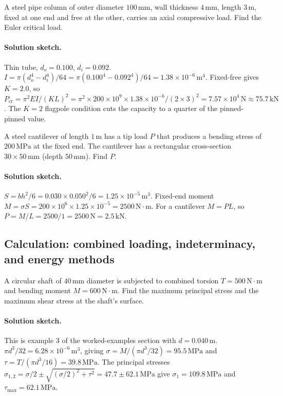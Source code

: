 \begin{exercise}
A steel pipe column of outer diameter $100\,\si{\milli\meter}$,
wall thickness $4\,\si{\milli\meter}$, length $3\,\si{\meter}$, fixed
at one end and free at the other, carries an axial compressive load.
Find the Euler critical load.

\paragraph{Solution sketch.} Thin tube, $d_o = 0.100$, $d_i = 0.092$.
$I = \pi(d_o^4 - d_i^4)/64 = \pi(0.100^4 - 0.092^4)/64 = 1.38\times
10^{-6}\,\si{\meter\tothe{4}}$. Fixed-free gives $K = 2.0$, so
$P_{\text{cr}} = \pi^2 E I/(KL)^2 = \pi^2\times 200\times 10^9 \times
1.38\times 10^{-6}/(2\times 3)^2 = 7.57\times 10^4\,\text{N} \approx
75.7\,\text{kN}$. The $K=2$ flagpole condition cuts the capacity to a
quarter of the pinned-pinned value.
\end{exercise}

\begin{exercise}
A steel cantilever of length $1\,\si{\meter}$ has a tip load
$P$ that produces a bending stress of $200\,\text{MPa}$ at the
fixed end. The cantilever has a rectangular cross-section $30
\times 50\,\si{\milli\meter}$ (depth $50\,\si{\milli\meter}$). Find
$P$.

\paragraph{Solution sketch.} $S = bh^2/6 = 0.030\times 0.050^2/6 =
1.25\times 10^{-5}\,\si{\meter\cubed}$. Fixed-end moment $M = \sigma S
= 200\times 10^6 \times 1.25\times 10^{-5} = 2500\,\text{N}\cdot\text{m}$.
For a cantilever $M = PL$, so $P = M/L = 2500/1 = 2500\,\text{N} =
2.5\,\text{kN}$.
\end{exercise}

\subsection*{Calculation: combined loading, indeterminacy, and energy
methods}

\begin{exercise}
A circular shaft of $40\,\si{\milli\meter}$ diameter is subjected to
combined torsion $T = 500\,\text{N}\cdot\text{m}$ and bending moment
$M = 600\,\text{N}\cdot\text{m}$. Find the maximum principal stress
and the maximum shear stress at the shaft's surface.

\paragraph{Solution sketch.} This is example 3 of the worked-examples
section with $d = 0.040\,\si{\meter}$. $\pi d^3/32 = 6.28\times 10^{-6}
\,\si{\meter\cubed}$, giving $\sigma = M/(\pi d^3/32) = 95.5\,\text{MPa}$
and $\tau = T/(\pi d^3/16) = 39.8\,\text{MPa}$. The principal stresses
$\sigma_{1,2} = \sigma/2 \pm \sqrt{(\sigma/2)^2 + \tau^2} = 47.7 \pm
62.1\,\text{MPa}$ give $\sigma_1 = 109.8\,\text{MPa}$ and $\tau_{\max}
= 62.1\,\text{MPa}$.
\end{exercise}

